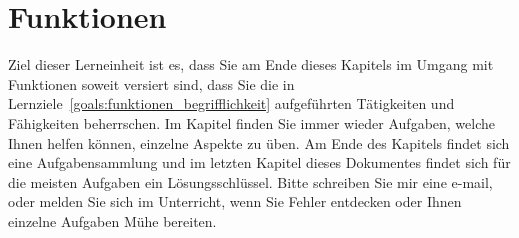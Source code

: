 \documentclass[12pt]{article}
\begin{document}
\section{Funktionen}
Ziel dieser Lerneinheit ist es, dass Sie am Ende dieses Kapitels im Umgang mit Funktionen soweit versiert sind, dass Sie die in Lernziele~\ref{goals:funktionen_begrifflichkeit} aufgeführten Tätigkeiten und Fähigkeiten beherrschen. Im Kapitel finden Sie immer wieder Aufgaben, welche Ihnen helfen können, einzelne Aspekte zu üben. Am Ende des Kapitels findet sich eine Aufgabensammlung und im letzten Kapitel dieses Dokumentes findet sich für die meisten Aufgaben ein Lösungsschlüssel. Bitte schreiben Sie mir eine e-mail, oder melden Sie sich im Unterricht, wenn Sie Fehler entdecken oder Ihnen einzelne Aufgaben Mühe bereiten.\\[1em]
%
%
\end{document}
